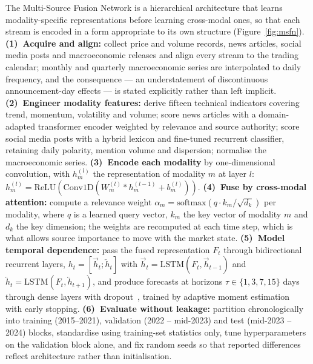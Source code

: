 The Multi-Source Fusion Network is a hierarchical architecture that learns modality-specific
representations before learning cross-modal ones, so that each stream is encoded in a form
appropriate to its own structure (Figure~\ref{fig:msfn}). \textbf{(1)~Acquire and align:}
collect price and volume records, news articles, social media posts and macroeconomic releases
and align every stream to the trading calendar; monthly and quarterly macroeconomic series are
interpolated to daily frequency, and the consequence --- an understatement of discontinuous
announcement-day effects --- is stated explicitly rather than left implicit.
\textbf{(2)~Engineer modality features:} derive fifteen technical indicators covering trend,
momentum, volatility and volume; score news articles with a domain-adapted transformer encoder
weighted by relevance and source authority; score social media posts with a hybrid lexicon and
fine-tuned recurrent classifier, retaining daily polarity, mention volume and dispersion;
normalise the macroeconomic series. \textbf{(3)~Encode each modality} by one-dimensional
convolution, with $h_m^{(l)}$ the representation of modality $m$ at layer $l$:
$h_m^{(l)} = \mathrm{ReLU}(\mathrm{Conv1D}(W_m^{(l)} * h_m^{(l-1)} + b_m^{(l)}))$.
\textbf{(4)~Fuse by cross-modal attention:} compute a relevance weight
$\alpha_m = \mathrm{softmax}(q \cdot k_m / \sqrt{d_k})$ per modality, where $q$ is a learned
query vector, $k_m$ the key vector of modality $m$ and $d_k$ the key dimension; the weights are
recomputed at each time step, which is what allows source importance to move with the market
state. \textbf{(5)~Model temporal dependence:} pass the fused representation $F_t$ through
bidirectional recurrent layers, $h_t = [\overrightarrow{h}_t ; \overleftarrow{h}_t]$ with
$\overrightarrow{h}_t = \mathrm{LSTM}(F_t, \overrightarrow{h}_{t-1})$ and
$\overleftarrow{h}_t = \mathrm{LSTM}(F_t, \overleftarrow{h}_{t+1})$, and produce forecasts at
horizons $\tau \in \{1,3,7,15\}$ days through dense layers with
dropout~\cite{srivastava2014dropout}, trained by adaptive moment
estimation~\cite{kingma2015adam} with early stopping. \textbf{(6)~Evaluate without leakage:}
partition chronologically into training (2015--2021), validation (2022 -- mid-2023) and test
(mid-2023 -- 2024) blocks, standardise using training-set statistics only, tune hyperparameters
on the validation block alone, and fix random seeds so that reported differences reflect
architecture rather than initialisation.

